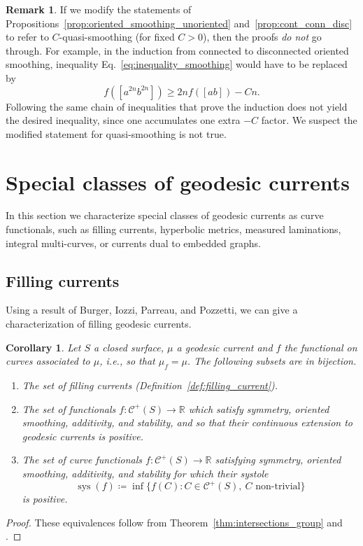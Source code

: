 \documentclass[11pt]{amsart}
\numberwithin{equation}{section}
\numberwithin{figure}{section}
\newtheorem{corollary}[theorem]{Corollary}
\theoremstyle{definition}
\newtheorem{remark}[theorem]{Remark}
\theoremstyle{plain}
\DeclareMathOperator{\sys}{sys}
\newcommand{\Curves}{\mathcal{C}}
\begin{document}
\begin{remark}
If we modify the statements of
Propositions~\ref{prop:oriented_smoothing_unoriented}
and~\ref{prop:cont_conn_disc} to refer to $C$-quasi-smoothing (for fixed
$C>0$), then the proofs \emph{do not} go through. For example, in the
induction from connected to disconnected
oriented smoothing, inequality Eq.~\eqref{eq:inequality_smoothing} would
have to be replaced by
\[
f([a^{2n}b^{2n}]) \geq 2nf([ab]) - C n.
\]
Following the same chain of inequalities that prove the induction does
not yield the desired inequality, since one accumulates one extra $-C$
factor. We suspect the modified statement for quasi-smoothing is not
true.
\end{remark}


\section{Special classes of geodesic currents}
\label{sec:special-classes}

In this section we characterize special classes of geodesic currents as curve functionals, such as filling currents, hyperbolic metrics, measured laminations, integral multi-curves, or currents dual to embedded graphs.

\subsection{Filling currents}
\label{subsec:filling}
Using a result of Burger, Iozzi, Parreau, and Pozzetti, we can give a
characterization of filling geodesic currents.

\begin{corollary}
  Let $S$ a closed surface,
  $\mu$ a geodesic current and $f$ the functional on curves associated
  to $\mu$, i.e., so that $\mu_f=\mu$. The following subsets are in
  bijection.
  
  

\begin{enumerate}
    \item The set of filling currents (Definition~\ref{def:filling_current}).
    \item The set of functionals $f \colon \Curves^+(S) \to
      \mathbb{R}$ which satisfy symmetry, oriented smoothing,
      additivity, and stability, and so that their continuous extension to geodesic currents is positive.
    \item The set of curve functionals $f \colon \Curves^+(S) \to
      \mathbb{R}$ satisfying symmetry, oriented smoothing, additivity,
      and stability for which their systole \[\sys(f)\coloneqq \inf \{
        f(C) : C \in \Curves^+(S),\ C \mbox{ non-trivial} \}\] is
      positive.
\end{enumerate}
\end{corollary}
\begin{proof}
These equivalences follow from Theorem~\ref{thm:intersections_group} and \cite[Theorem~1.3]{BIPP21:Systoles}.
\end{proof}
\end{document}
